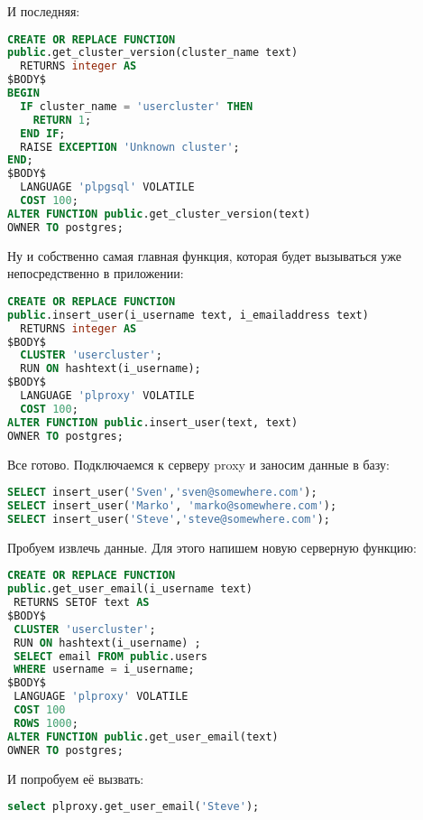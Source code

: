 И последняя:

\begin{lstlisting}[language=SQL,label=lst:plproxy9,caption=Настройка]
CREATE OR REPLACE FUNCTION
public.get_cluster_version(cluster_name text)
  RETURNS integer AS
$BODY$
BEGIN
  IF cluster_name = 'usercluster' THEN
    RETURN 1;
  END IF;
  RAISE EXCEPTION 'Unknown cluster';
END;
$BODY$
  LANGUAGE 'plpgsql' VOLATILE
  COST 100;
ALTER FUNCTION public.get_cluster_version(text)
OWNER TO postgres;
\end{lstlisting}

Ну и собственно самая главная функция, которая будет вызываться уже непосредственно в приложении:

\begin{lstlisting}[language=SQL,label=lst:plproxy10,caption=Настройка]
CREATE OR REPLACE FUNCTION
public.insert_user(i_username text, i_emailaddress text)
  RETURNS integer AS
$BODY$
  CLUSTER 'usercluster';
  RUN ON hashtext(i_username);
$BODY$
  LANGUAGE 'plproxy' VOLATILE
  COST 100;
ALTER FUNCTION public.insert_user(text, text)
OWNER TO postgres;
\end{lstlisting}

Все готово. Подключаемся к серверу proxy и заносим данные в базу:

\begin{lstlisting}[language=SQL,label=lst:plproxy11,caption=Настройка]
SELECT insert_user('Sven','sven@somewhere.com');
SELECT insert_user('Marko', 'marko@somewhere.com');
SELECT insert_user('Steve','steve@somewhere.com');
\end{lstlisting}

Пробуем извлечь данные. Для этого напишем новую серверную функцию:

\begin{lstlisting}[language=SQL,label=lst:plproxy12,caption=Настройка]
CREATE OR REPLACE FUNCTION
public.get_user_email(i_username text)
 RETURNS SETOF text AS
$BODY$
 CLUSTER 'usercluster';
 RUN ON hashtext(i_username) ;
 SELECT email FROM public.users
 WHERE username = i_username;
$BODY$
 LANGUAGE 'plproxy' VOLATILE
 COST 100
 ROWS 1000;
ALTER FUNCTION public.get_user_email(text)
OWNER TO postgres;
\end{lstlisting}

И попробуем её вызвать:

\begin{lstlisting}[language=SQL,label=lst:plproxy13,caption=Настройка]
select plproxy.get_user_email('Steve');
\end{lstlisting}

